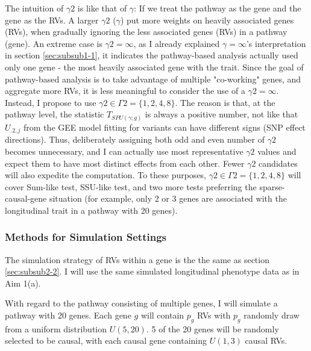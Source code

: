 \documentclass[12pt]{article}
\begin{document}
The intuition of $\gamma 2$ is like that of $\gamma$: If we treat the pathway as the gene and the gene as the RVs. A larger $\gamma 2$ ($\gamma$) put more weights on heavily associated genes (RVs), when gradually ignoring the less associated genes (RVs) in a pathway (gene). An extreme case is $\gamma 2 = \infty$, as I already explained $\gamma = \infty$'s interpretation in section \ref{sec:subsub1-1}, it indicates the pathway-based analysis actually used only one gene - the most heavily associated gene with the trait. Since the goal of pathway-based analysis is to take advantage of multiple "co-working" genes, and aggregate more RVs, it is less meaningful to consider the use of a $\gamma 2= \infty$. Instead, I propose to use $\gamma 2 \in \Gamma 2 = \{1,2,4,8\}$. The reason is that, at the pathway level, the statistic $T_ { SPU(\gamma ; g) }$ is always a positive number, not like that $U_{.2,j}$ from the GEE model fitting for variants can have different signs (SNP effect directions). Thus, deliberately assigning both odd and even number of $\gamma 2$ becomes unnecessary, and I can actually use most representative $\gamma 2$ values and expect them to have most distinct effects from each other. Fewer $\gamma 2$ candidates will also expedite the computation. To these purposes, $\gamma 2 \in \Gamma 2 = \{1,2,4,8\}$ will cover Sum-like test, SSU-like test, and two more tests preferring the sparse-causal-gene situation (for example, only 2 or 3 genes are associated with the longitudinal trait in a pathway with 20 genes). 

\subsubsection{Methods for Simulation Settings}\label{sec:aim2-2}
The simulation strategy of RVs within a gene is the the same as section \ref{sec:subsub2-2}. I will use the same simulated longitudinal phenotype data as in Aim 1(a).

With regard to the pathway consisting of multiple genes, I will simulate a pathway with 20 genes. Each gene $g$ will contain $p_g$ RVs with $p_g$ randomly draw from a uniform distribution $U(5,20)$. 5 of the 20 genes will be randomly selected to be causal, with each causal gene containing $U(1,3)$ causal RVs.

\end{document}
